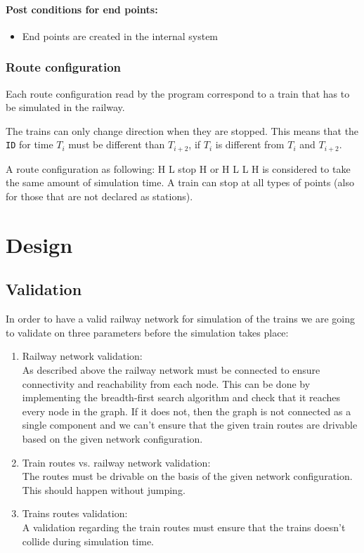 \documentclass[10pt,a4paper]{article}
\def\Code#1{\texttt{#1}}
\begin{document}
\paragraph{Post conditions for end points:}
\begin{itemize}
  \item End points are created in the internal system
\end{itemize}

\subsubsection{Route configuration}
 
Each route configuration read by the program correspond to a train that has to be simulated in the railway.
 
The trains can only change direction when they are stopped. This means that the \Code{ID} for time $T_i$ must be different than $T_{i+2}$, if $T_i$ is different from $T_i$ and $T_{i+2}$.
 
A route configuration as following: H L stop H or H L L H is considered to take the same amount of simulation time. A train can stop at all types of points (also for those that are not declared as stations).

\section{Design}
\subsection{Validation}
 
In order to have a valid railway network for simulation of the trains we are going to validate on three parameters before the simulation takes place:
\begin{enumerate}
\item Railway network validation: \\
      As described above the railway network must be connected to ensure connectivity and reachability from each node. This can be done by implementing the breadth-first search algorithm and check that it reaches every node in the graph. If it does not, then the graph is not connected as a single component and we can’t ensure that the given train routes are drivable based on the given network configuration.
 
\item Train routes vs. railway network validation: \\
      The routes must be drivable on the basis of the given network configuration. This should happen without jumping.
 
\item Trains routes validation: \\
      A validation regarding the train routes must ensure that the trains doesn’t collide during simulation time. 

\end{enumerate}
  
\end{document}
